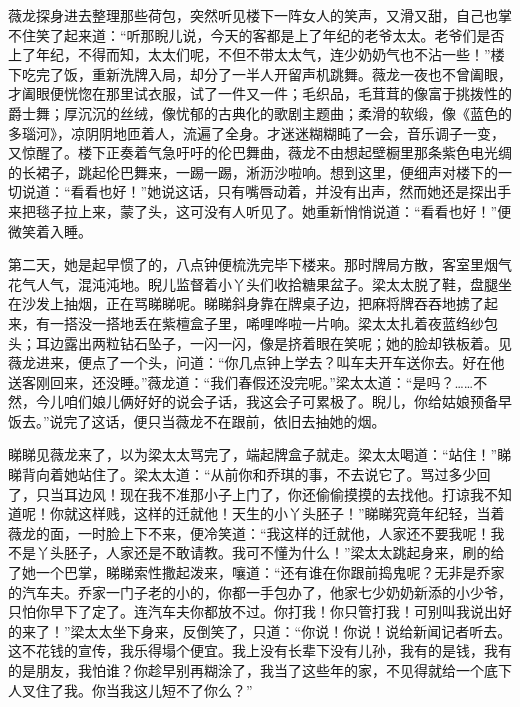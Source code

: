 \par 薇龙探身进去整理那些荷包，突然听见楼下一阵女人的笑声，又滑又甜，自己也掌不住笑了起来道：“听那睨儿说，今天的客都是上了年纪的老爷太太。老爷们是否上了年纪，不得而知，太太们呢，不但不带太太气，连少奶奶气也不沾一些！”楼下吃完了饭，重新洗牌入局，却分了一半人开留声机跳舞。薇龙一夜也不曾阖眼，才阖眼便恍惚在那里试衣服，试了一件又一件；毛织品，毛茸茸的像富于挑拨性的爵士舞；厚沉沉的丝绒，像忧郁的古典化的歌剧主题曲；柔滑的软缎，像《蓝色的多瑙河》，凉阴阴地匝着人，流遍了全身。才迷迷糊糊盹了一会，音乐调子一变，又惊醒了。楼下正奏着气急吁吁的伦巴舞曲，薇龙不由想起壁橱里那条紫色电光绸的长裙子，跳起伦巴舞来，一踢一踢，淅沥沙啦响。想到这里，便细声对楼下的一切说道：“看看也好！”她说这话，只有嘴唇动着，并没有出声，然而她还是探出手来把毯子拉上来，蒙了头，这可没有人听见了。她重新悄悄说道：“看看也好！”便微笑着入睡。
\par 第二天，她是起早惯了的，八点钟便梳洗完毕下楼来。那时牌局方散，客室里烟气花气人气，混沌沌地。睨儿监督着小丫头们收拾糖果盆子。梁太太脱了鞋，盘腿坐在沙发上抽烟，正在骂睇睇呢。睇睇斜身靠在牌桌子边，把麻将牌吞吞地掳了起来，有一搭没一搭地丢在紫檀盒子里，唏哩哗啦一片响。梁太太扎着夜蓝绉纱包头；耳边露出两粒钻石坠子，一闪一闪，像是挤着眼在笑呢；她的脸却铁板着。见薇龙进来，便点了一个头，问道：“你几点钟上学去？叫车夫开车送你去。好在他送客刚回来，还没睡。”薇龙道：“我们春假还没完呢。”梁太太道：“是吗？……不然，今儿咱们娘儿俩好好的说会子话，我这会子可累极了。睨儿，你给姑娘预备早饭去。”说完了这话，便只当薇龙不在跟前，依旧去抽她的烟。
\par 睇睇见薇龙来了，以为梁太太骂完了，端起牌盒子就走。梁太太喝道：“站住！”睇睇背向着她站住了。梁太太道：“从前你和乔琪的事，不去说它了。骂过多少回了，只当耳边风！现在我不准那小子上门了，你还偷偷摸摸的去找他。打谅我不知道呢！你就这样贱，这样的迁就他！天生的小丫头胚子！”睇睇究竟年纪轻，当着薇龙的面，一时脸上下不来，便冷笑道：“我这样的迁就他，人家还不要我呢！我不是丫头胚子，人家还是不敢请教。我可不懂为什么！”梁太太跳起身来，刷的给了她一个巴掌，睇睇索性撒起泼来，嚷道：“还有谁在你跟前捣鬼呢？无非是乔家的汽车夫。乔家一门子老的小的，你都一手包办了，他家七少奶奶新添的小少爷，只怕你早下了定了。连汽车夫你都放不过。你打我！你只管打我！可别叫我说出好的来了！”梁太太坐下身来，反倒笑了，只道：“你说！你说！说给新闻记者听去。这不花钱的宣传，我乐得塌个便宜。我上没有长辈下没有儿孙，我有的是钱，我有的是朋友，我怕谁？你趁早别再糊涂了，我当了这些年的家，不见得就给一个底下人叉住了我。你当我这儿短不了你么？”
